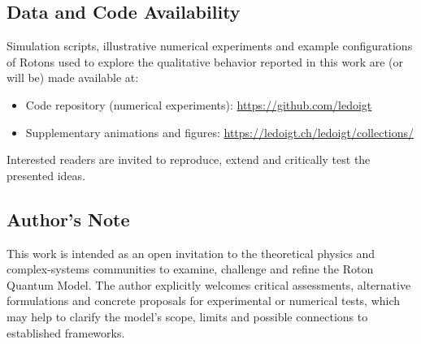 \documentclass[11pt,a4paper]{article}
\begin{document}
\subsection*{Data and Code Availability}
Simulation scripts, illustrative numerical experiments and example configurations of Rotons 
used to explore the qualitative behavior reported in this work are (or will be) made available at:
\begin{itemize}
  \item Code repository (numerical experiments): \url{https://github.com/ledoigt}
  \item Supplementary animations and figures: \url{https://ledoigt.ch/ledoigt/collections/}
\end{itemize}
Interested readers are invited to reproduce, extend and critically test the presented ideas.

\subsection*{Author’s Note}
This work is intended as an open invitation to the theoretical physics and complex-systems 
communities to examine, challenge and refine the Roton Quantum Model. The author 
explicitly welcomes critical assessments, alternative formulations and concrete proposals 
for experimental or numerical tests, which may help to clarify the model’s scope, limits 
and possible connections to established frameworks.
\end{document}
